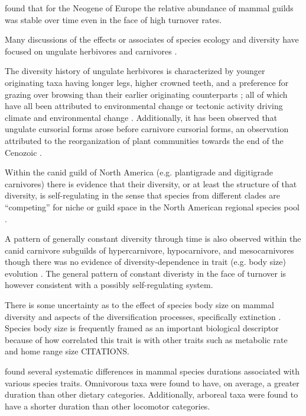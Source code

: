 \documentclass[12pt,letterpaper]{article}
\begin{document}
\citet{Jernvall2004} found that for the Neogene of Europe the relative abundance of mammal guilds was stable over time even in the face of high turnover rates.

Many discussions of the effects or associates of species ecology and diversity have focused on ungulate herbivores \citep{Janis2004,Janis2000,Janis1993c,Janis2008a} and carnivores \citep{Pires2015a,Slater2015c,Janis1993c,Silvestro2015b}.

The diversity history of ungulate herbivores is characterized by younger originating taxa having longer legs, higher crowned teeth, and a preference for grazing over browsing than their earlier originating counterparts \citep{Janis2004,Janis2000,Janis1993c,Janis2008a}; all of which have all been attributed to environmental change or tectonic activity driving climate and environmental change \citep{Janis2008a,Eronen2015,Blois2009}. Additionally, it has been observed that ungulate cursorial forms arose before carnivore cursorial forms, an observation attributed to the reorganization of plant communities towards the end of the Cenozoic \citep{Janis1993c}.

Within the canid guild of North America (e.g. plantigrade and digitigrade carnivores) there is evidence that their diversity, or at least the structure of that diversity, is self-regulating in the sense that species from different clades are ``competing'' for niche or guild space in the North American regional species pool \citep{Silvestro2015b}.

A pattern of generally constant diversity through time is also observed within the canid carnivore subguilds of hypercarnivore, hypocarnivore, and mesocarnivores though there was no evidence of diversity-dependence in trait (e.g. body size) evolution \citep{Slater2015c}. The general pattern of constant diveristy in the face of turnover is however consistent with a possibly self-regulating system.

There is some uncertainty as to the effect of species body size on mammal diversity and aspects of the diversification processes, specifically extinction \citep{Liow2008,Liow2009,Tomiya2013,Smits2015b}. Species body size is frequently framed as an important biological descriptor because of how correlated this trait is with other traits such as metabolic rate and home range size CITATIONS.

\citet{Smits2015b} found several systematic differences in mammal species durations associated with various species traits. Omnivorous taxa were found to have, on average, a greater duration than other dietary categories. Additionally, arboreal taxa were found to have a shorter duration than other locomotor categories. 
\end{document}
